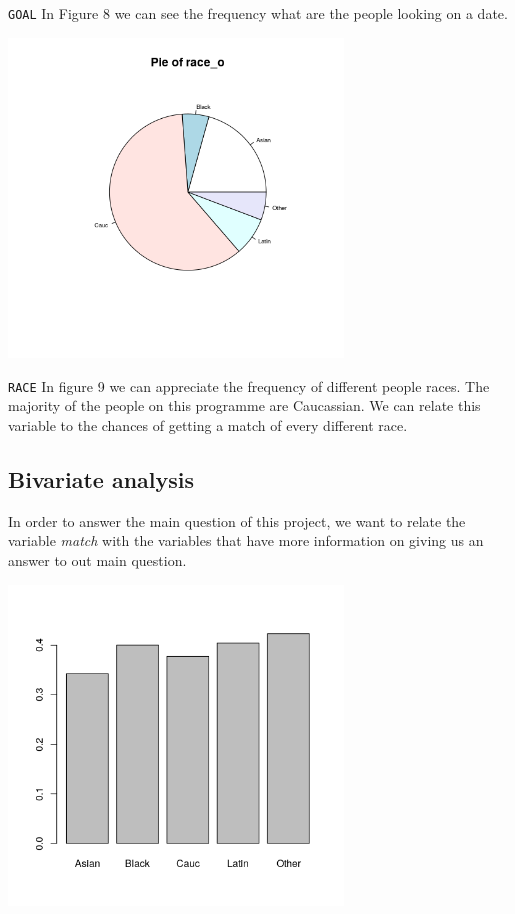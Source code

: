\texttt{GOAL}
In Figure 8 we can see the frequency what are the people looking on a date.

\begin{center}
\includegraphics[width=3.5in]{images/Hist_Plots_Analysis/qu3esito_race_o.png}
\label{fig:aLabelForReferencing}
\end{center}

\texttt{RACE}
In figure 9 we can appreciate the frequency of different people races. The majority of the people on this programme are Caucassian. We can relate this variable to the chances of getting a match of every different race.




\subsection{Bivariate analysis}

In order to answer the main question of this project, we want to relate the variable \textit{match} with the variables that have more information on giving us an answer to out main question.

\begin{center}
\includegraphics[width=3.5in]{images/Hist_Plots_Analysis/bivar_match_race.png}
\label{fig:aLabelForReferencing}
\end{center}

